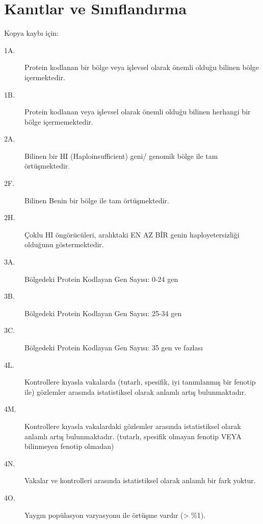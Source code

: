 \documentclass{article}
\begin{document}
\section{Kanıtlar ve Sınıflandırma}

Kopya kaybı için:
\begin{description}
	\item[1A.] Protein kodlanan bir bölge veya işlevsel olarak önemli olduğu bilinen bölge içermektedir.
	\item[1B.] Protein kodlanan veya işlevsel olarak önemli olduğu bilinen herhangi bir bölge içermemektedir.
	\item[2A.] Bilinen bir HI (Haploinsufficient) geni/ genomik bölge ile tam örtüşmektedir. 
	\item[2F.] Bilinen Benin bir bölge ile tam örtüşmektedir.
	\item[2H.] Çoklu HI öngörücüleri, aralıktaki EN AZ BİR genin haployetersizliği olduğunu göstermektedir.
	\item[3A.] Bölgedeki Protein Kodlayan Gen Sayısı: 0-24 gen
	\item[3B.] Bölgedeki Protein Kodlayan Gen Sayısı: 25-34 gen
	\item[3C.] Bölgedeki Protein Kodlayan Gen Sayısı: 35 gen ve fazlası
	\item[4L.] Kontrollere kıyasla vakalarda (tutarlı, spesifik, iyi tanımlanmış bir fenotip ile) gözlemler arasında istatistiksel olarak anlamlı artış bulunmaktadır.
	\item[4M.] Kontrollere kıyasla vakalardaki gözlemler arasında istatistiksel olarak anlamlı artış bulunmaktadır. (tutarlı, spesifik olmayan fenotip VEYA bilinmeyen fenotip olmadan)
	\item[4N.] Vakalar ve kontrolleri arasında istatistiksel olarak anlamlı bir fark yoktur.
	\item[4O.] Yaygın popülasyon varyasyonu ile örtüşme vardır (> \%1). 
\end{description}
\end{document}
